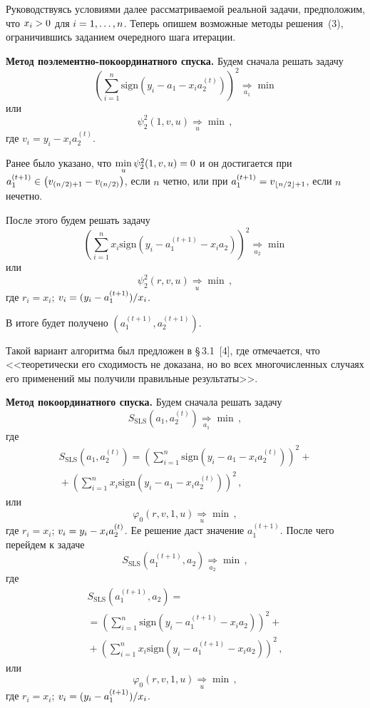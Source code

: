 \begin{multicols}{2}
     Руководствуясь условиями далее рассматри\-ва\-емой реальной задачи,
предположим, что $x_i\hm>0$ для $i\hm= 1,\ldots , n$. Теперь опишем
возможные методы решения~(3), ограничившись заданием очередного шага
итерации.

     \smallskip

     \textbf{Метод поэлементно-покоординатного спуска.} Будем сначала
решать задачу
$$
\left(\sum\limits_{i=1}^n \mathrm{sign}\left( y_i-a_1-x_ia_2^{(t)}\right)
\right)^2\underset{a_1}{\Rightarrow}\min
$$
или
$$
\psi_2^2(1,v,u)\underset{u}{\Rightarrow}\min\,,
$$
где $v_i=y_i-x_i a_2^{(t)}$.

     Ранее было указано, что $\min\limits_u \psi_2^2(1,v,u)\hm=0$ и он
достигается
     при $a_1^{(t+1)}\hm\in \left(v_{(n/2)+1}-v_{(n/2)}\right)$, если $n$ четно, или
     при $a_1^{(t+1)} \hm= v_{\lfloor n/2\rfloor +1}$, если $n$ нечетно.

     После этого будем решать задачу
     $$
     \left( \sum\limits_{i=1}^n x_i \mathrm{sign} \left( y_i -a_1^{(t+1)} -x_i
a_2\right)\right)^2 \underset{a_2}{\Rightarrow}\min
     $$
или
$$
\psi_2^2(r,v,u) \underset{u}{\Rightarrow}\min\,,
$$
где $r_i=x_i$; $v_i\hm= (y_i -a_1^{(t+1)})/x_i$.

     В итоге будет получено $\left( a_1^{(t+1)}, a_2^{(t+1)}\right)$.

     Такой вариант алгоритма был предложен в \S\,3.1~[4], где отмечается, что
<<теоретически его сходимость не доказана, но во всех многочисленных
случаях его применений мы получили правильные результаты>>.

     \smallskip

     \textbf{Метод покоординатного спуска.} Будем сначала решать задачу
     $$S_{\mathrm{SLS}} \left(a_1, a_2^{(t)}\right) \underset{a_1}{\Rightarrow}\min\,,
     $$
где
\begin{multline*}
S_{\mathrm{SLS}} \left( a_1,a_2^{(t)}\right) = \left( \sum\limits_{i=1}^n
\mathrm{sign} \left( y_i -a_1 -
x_ia_2^{(t)}\right)\right)^2+{}\\
{}+ \left( \sum\limits_{i=1}^n x_i \mathrm{sign} \left( y_i -a_1 - x_i a_2^{(t)} \right)
\right)^2\,,
\end{multline*}
или
$$
\varphi_0(r,v,1,u) \underset{u}{\Rightarrow}\min\,,
$$
где $r_i= x_i$; $v_i=y_i\hm- x_i a_2^{(t)}$.
Ее решение даст значение $a_1^{(t+1)}$. После чего перейдем к задаче
$$
S_{\mathrm{SLS}} \left( a_1^{(t+1)}, a_2\right) \underset{a_2}{\Rightarrow}\min\,,
$$
где
\begin{multline*}
S_{\mathrm{SLS}} \left(  a_1^{(t+1)},a_2\right) ={}\\
{}=
\left( \sum\limits_{i=1}^n \mathrm{sign}
\left( y_i -a_1^{(t+1)} -x_ia_2\right) \right)^2+{}\\
{}+\left( \sum\limits_{i=1}^n x_i \mathrm{sign} \left( y_i -a_1^{(t+1)} -x_i a_2\right)
\right)^2\,,
\end{multline*}
или
$$
\varphi_0(r,v,1,u)\underset{u}{\Rightarrow}\min\,,
$$
где $r_i =x_i$; $v_i\hm= (y_i-a_1^{(t+1)})/x_i$.


\end{multicols}
